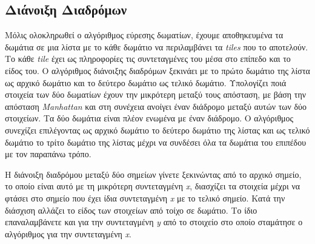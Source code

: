 \subsection{Διάνοιξη Διαδρόμων}
\par
Μόλις ολοκληρωθεί ο αλγόριθμος εύρεσης δωματίων, έχουμε αποθηκευμένα τα δωμάτια σε μια λίστα με το κάθε δωμάτιο να περιλαμβάνει τα \textit{tiles} που το αποτελούν. Το κάθε \textit{tile} έχει ως πληροφορίες τις συντεταγμένες του μέσα στο επίπεδο και το είδος του. Ο αλγόριθμος διάνοιξης διαδρόμων ξεκινάει με το πρώτο δωμάτιο της λίστα ως αρχικό δωμάτιο και το δεύτερο δωμάτιο ως τελικό δωμάτιο. Υπολογίζει ποιά στοιχεία των δύο δωματίων έχουν την μικρότερη μεταξύ τους απόσταση, με βάση την απόσταση \textit{Manhattan} και στη συνέχεια ανοίγει έναν διάδρομο μεταξύ αυτών των δύο στοιχείων. Τα δύο δωμάτια είναι πλέον ενωμένα με έναν διάδρομο. Ο αλγόριθμος συνεχίζει επιλέγοντας ως αρχικό δωμάτιο το δεύτερο δωμάτιο της λίστας και ως τελικό δωμάτιο το τρίτο δωμάτιο της λίστας μέχρι να συνδέσει όλα τα δωμάτια του επιπέδου με τον παραπάνω τρόπο.
\par
H διάνοιξη διαδρόμου μεταξύ δύο σημείων γίνετε ξεκινώντας από το αρχικό σημείο, το οποίο είναι αυτό με τη μικρότερη συντεταγμένη \textit{x}, διασχίζει τα στοιχεία μέχρι να φτάσει στο σημείο που έχει ίδια συντεταγμένη \textit{x} με το τελικό σημείο. Κατά την διάσχιση αλλάζει το είδος των στοιχείων από τοίχο σε δωμάτιο. Το ίδιο επαναλαμβάνετε και για την συντεταγμένη \textit{y} από το στοιχείο στο οποίο σταμάτησε ο αλγόριθμος για την συντεταγμένη \textit{x}.

